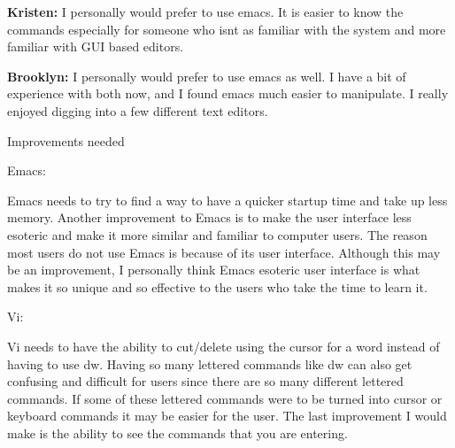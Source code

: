 \documentclass{article} %
\begin{document}
\noindent \textbf{Kristen:} I personally would prefer to use emacs. It is easier to know the commands especially for someone who isnt as familiar with the system and more familiar with GUI based editors.

\noindent 

\noindent \textbf{Brooklyn:} I personally would prefer to use emacs as well. I have a bit of experience with both now, and I found emacs much easier to manipulate. I really enjoyed digging into a few different text editors.

\noindent 

\noindent Improvements needed

\noindent 

\noindent Emacs:

\noindent 

\noindent Emacs needs to try to find a way to have a quicker startup time and take up less memory. Another improvement to Emacs is to make the user interface less esoteric and make it more similar and familiar to computer users. The reason most users do not use Emacs is because of its user interface. Although this may be an improvement, I personally think Emacs esoteric user interface is what makes it so unique and so effective to the users who take the time to learn it.

\noindent 

\noindent Vi:

\noindent 

\noindent Vi needs to have the ability to cut/delete using the cursor for a word instead of having to use dw. Having so many lettered commands like dw can also get confusing and difficult for users since there are so many different lettered commands. If some of these lettered commands were to be turned into cursor or keyboard commands it may be easier for the user. The last improvement I would make is the ability to see the commands that you are entering. 

\noindent 

\noindent 

\noindent 

\noindent 
\end{document}
